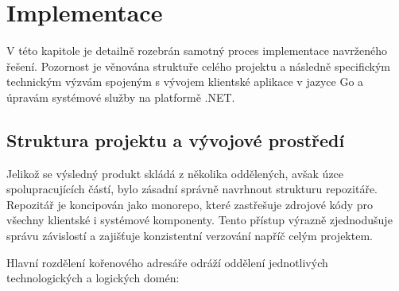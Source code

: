 \chapter{Implementace}
\label{chap:implementace}

V této kapitole je detailně rozebrán samotný proces implementace navrženého řešení. Pozornost je věnována struktuře celého projektu a následně specifickým technickým výzvám spojeným s vývojem klientské aplikace v jazyce Go a úpravám systémové služby na platformě .NET.

\section{Struktura projektu a vývojové prostředí}
Jelikož se výsledný produkt skládá z několika oddělených, avšak úzce spolupracujících částí, bylo zásadní správně navrhnout strukturu repozitáře. Repozitář je koncipován jako monorepo, které zastřešuje zdrojové kódy pro všechny klientské i systémové komponenty. Tento přístup výrazně zjednodušuje správu závislostí a zajišťuje konzistentní verzování napříč celým projektem.

Hlavní rozdělení kořenového adresáře odráží oddělení jednotlivých technologických a logických domén:

